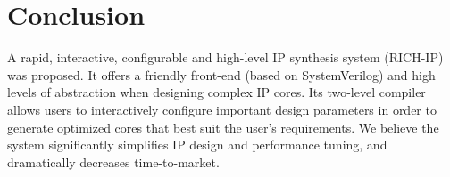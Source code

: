 \section{Conclusion} 

A rapid, interactive, configurable and high-level IP synthesis system (RICH-IP)
was proposed. It offers a friendly front-end (based on SystemVerilog) and 
high levels of abstraction when designing complex IP cores. Its two-level
compiler allows users to interactively configure important design parameters 
in order to generate optimized cores that best suit the user's requirements.
We believe the system significantly simplifies IP design and 
performance tuning, and dramatically decreases time-to-market. 

